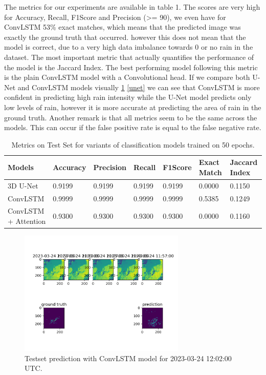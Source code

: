 The metrics for our experiments are available in table 1. The scores are very high for Accuracy, Recall, F1Score and Precision (>= 90), we even 
have for ConvLSTM 53\% exact matches, which means that the predicted image was exactly the ground truth that occurred.
however this does not mean that the model is correct, due to a very high data imbalance towards 0 or no rain in the dataset.
The most important metric that actually quantifies the performance of the model is the Jaccard Index. The best performing model following this metric is the plain ConvLSTM model
with a Convolutional head. If we compare both U-Net and ConvLSTM models visually \ref{fig:convclass} \ref{unet} we can see that ConvLSTM is more confident in predicting high rain intensity
while the U-Net model predicts only low levels of rain, however it is more accurate at predicting the area of rain in the ground truth. Another remark is that all metrics seem to be the same across the models.
This can occur if the false positive rate is equal to the false negative rate.

\begin{table}[]
  \caption[short]{Metrics on Test Set for variants of classification models trained on 50 epochs.}
  \begin{tabular}{@{}lllllll@{}}
  \toprule
  Models               & Accuracy & Precision & Recall & F1Score & Exact Match & Jaccard Index \\ \midrule
  3D U-Net                & 0.9199   & 0.9199    & 0.9199 & 0.9199  & 0.0000      & 0.1150        \\
  ConvLSTM             & 0.9999   & 0.9999    & 0.9999 & 0.9999  & 0.5385      & 0.1249        \\
  ConvLSTM + Attention & 0.9300   & 0.9300    & 0.9300 & 0.9300  & 0.0000      & 0.1160 
  \end{tabular}
\end{table}


\begin{figure}[hbp]
  \centering
  \includegraphics[width=225pt]{./images/experiment-0.png}
  \caption{Testset prediction with ConvLSTM model for 2023-03-24 12:02:00 UTC.}
  \Description{}
  \label{fig:convclass}
\end{figure}

